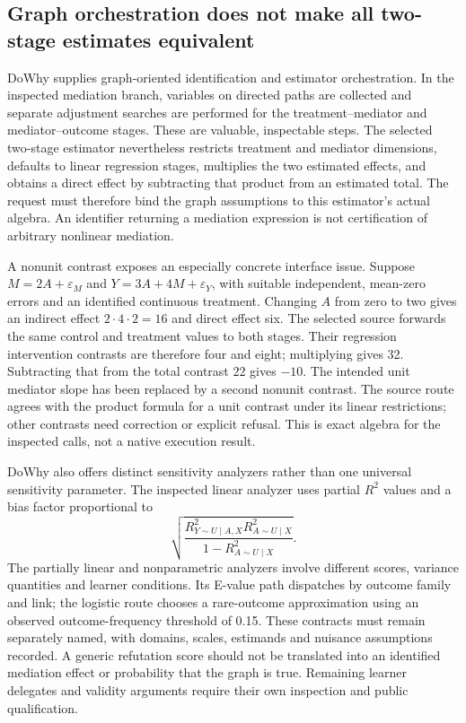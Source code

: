\subsection{Graph orchestration does not make all two-stage estimates equivalent}
DoWhy supplies graph-oriented identification and estimator orchestration. In the inspected mediation branch, variables on directed paths are collected and separate adjustment searches are performed for the treatment--mediator and mediator--outcome stages. These are valuable, inspectable steps. The selected two-stage estimator nevertheless restricts treatment and mediator dimensions, defaults to linear regression stages, multiplies the two estimated effects, and obtains a direct effect by subtracting that product from an estimated total. The request must therefore bind the graph assumptions to this estimator's actual algebra. An identifier returning a mediation expression is not certification of arbitrary nonlinear mediation. \cite{exec25_pymed_dowhy}

A nonunit contrast exposes an especially concrete interface issue. Suppose $M=2A+\varepsilon_M$ and $Y=3A+4M+\varepsilon_Y$, with suitable independent, mean-zero errors and an identified continuous treatment. Changing $A$ from zero to two gives an indirect effect $2\cdot4\cdot2=16$ and direct effect six. The selected source forwards the same control and treatment values to both stages. Their regression intervention contrasts are therefore four and eight; multiplying gives 32. Subtracting that from the total contrast 22 gives $-10$. The intended unit mediator slope has been replaced by a second nonunit contrast. The source route agrees with the product formula for a unit contrast under its linear restrictions; other contrasts need correction or explicit refusal. This is exact algebra for the inspected calls, not a native execution result. \cite{exec25_pymed_dowhy,exec25_pymed_choice}

DoWhy also offers distinct sensitivity analyzers rather than one universal sensitivity parameter. The inspected linear analyzer uses partial $R^2$ values and a bias factor proportional to
\[
 \sqrt{\frac{R^2_{Y\sim U\mid A,X}R^2_{A\sim U\mid X}}
 {1-R^2_{A\sim U\mid X}}}.
\]
The partially linear and nonparametric analyzers involve different scores, variance quantities and learner conditions. Its E-value path dispatches by outcome family and link; the logistic route chooses a rare-outcome approximation using an observed outcome-frequency threshold of 0.15. These contracts must remain separately named, with domains, scales, estimands and nuisance assumptions recorded. A generic refutation score should not be translated into an identified mediation effect or probability that the graph is true. Remaining learner delegates and validity arguments require their own inspection and public qualification. \cite{exec25_pymed_dowhy,exec25_pymed_choice}

